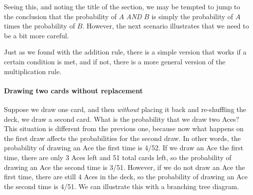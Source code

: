 Seeing this, and noting the title of the section, we may be tempted to jump to the conclusion that the probability of $A$ \emph{AND} $B$ is simply the probability of $A$ times the probability of $B$.  However, the next scenario illustrates that we need to be a bit more careful.

Just as we found with the addition rule, there is a simple version that works if a certain condition is met, and if not, there is a more general version of the multiplication rule.

\paragraph{Drawing two cards without replacement}
Suppose we draw one card, and then \emph{without} placing it back and re-shuffling the deck, we draw a second card.  What is the probability that we draw two Aces?\\

This situation is different from the previous one, because now what happens on the first draw affects the probabilities for the second draw.  In other words, the probability of drawing an Ace the first time is 4/52.  If we draw an Ace the first time, there are only 3 Aces left and 51 total cards left, so the probability of drawing an Ace the second time is 3/51.  However, if we do not draw an Ace the first time, there are still 4 Aces in the deck, so the probability of drawing an Ace the second time is 4/51.  We can illustrate this with a branching tree diagram.

\begin{center}
\end{center}

